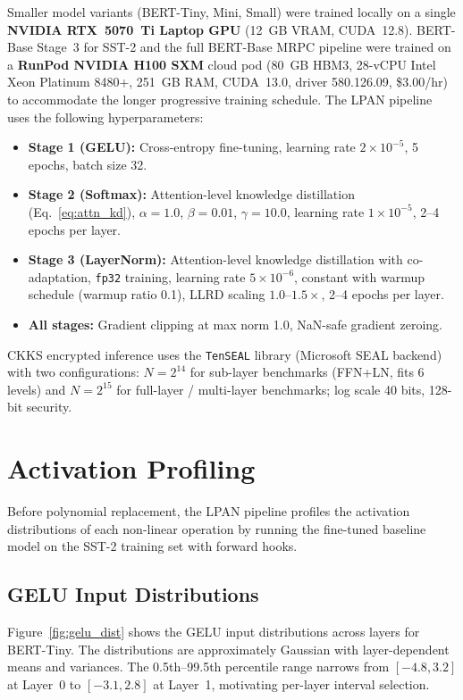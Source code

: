 Smaller model variants (BERT-Tiny, Mini, Small) were trained locally on a single \textbf{NVIDIA RTX~5070~Ti Laptop GPU} (12~GB VRAM, CUDA~12.8). BERT-Base Stage~3 for SST-2 and the full BERT-Base MRPC pipeline were trained on a \textbf{RunPod NVIDIA H100 SXM} cloud pod (80~GB HBM3, 28-vCPU Intel Xeon Platinum 8480+, 251~GB RAM, CUDA~13.0, driver 580.126.09, \$3.00/hr) to accommodate the longer progressive training schedule. The LPAN pipeline uses the following hyperparameters:

\begin{itemize}
    \item \textbf{Stage 1 (GELU):} Cross-entropy fine-tuning, learning rate $2 \times 10^{-5}$, 5 epochs, batch size 32.
    \item \textbf{Stage 2 (Softmax):} Attention-level knowledge distillation (Eq.~\ref{eq:attn_kd}), $\alpha=1.0$, $\beta=0.01$, $\gamma=10.0$, learning rate $1 \times 10^{-5}$, 2--4 epochs per layer.
    \item \textbf{Stage 3 (LayerNorm):} Attention-level knowledge distillation with co-adaptation, \texttt{fp32} training, learning rate $5 \times 10^{-6}$, constant with warmup schedule (warmup ratio 0.1), LLRD scaling $1.0$--$1.5\times$, 2--4 epochs per layer.
    \item \textbf{All stages:} Gradient clipping at max norm 1.0, NaN-safe gradient zeroing.
\end{itemize}

CKKS encrypted inference uses the \texttt{TenSEAL} library (Microsoft SEAL backend) with two configurations: $N = 2^{14}$ for sub-layer benchmarks (FFN+LN, fits 6 levels) and $N = 2^{15}$ for full-layer / multi-layer benchmarks; log scale 40 bits, 128-bit security.


\section{Activation Profiling}
\label{sec:profiling}

Before polynomial replacement, the LPAN pipeline profiles the activation distributions of each non-linear operation by running the fine-tuned baseline model on the SST-2 training set with forward hooks.

\subsection{GELU Input Distributions}

Figure~\ref{fig:gelu_dist} shows the GELU input distributions across layers for BERT-Tiny. The distributions are approximately Gaussian with layer-dependent means and variances. The 0.5th--99.5th percentile range narrows from $[-4.8, 3.2]$ at Layer~0 to $[-3.1, 2.8]$ at Layer~1, motivating per-layer interval selection.


